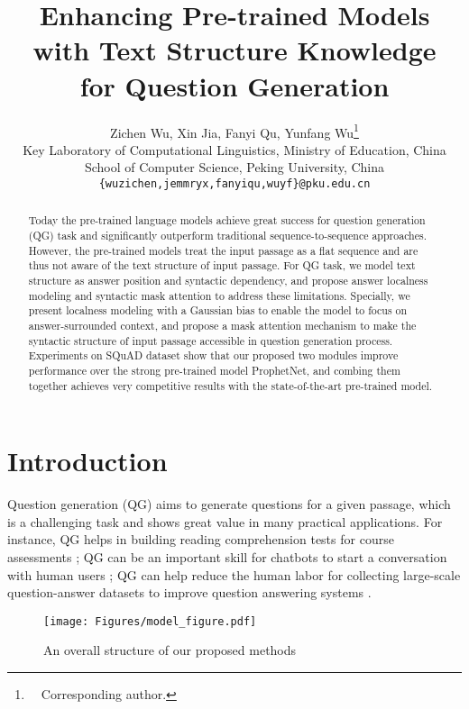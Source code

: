 \documentclass[11pt]{article}
\title{Enhancing Pre-trained Models with Text Structure Knowledge \\ for Question Generation}
\author{Zichen Wu, Xin Jia, Fanyi Qu, Yunfang Wu\thanks{\ \  Corresponding author.} \\
Key Laboratory of Computational Linguistics, Ministry of Education, China \\
School of Computer Science, Peking University, China\\
\texttt{\{wuzichen,jemmryx,fanyiqu,wuyf\}@pku.edu.cn}}
\begin{document}
\maketitle
\begin{abstract}
Today the pre-trained language models achieve great success for question generation (QG) task and significantly outperform traditional sequence-to-sequence approaches. However, the pre-trained models treat the input passage as a flat sequence and are thus not aware of the text structure of input passage. For QG task, we model text structure as answer position and syntactic dependency, and propose answer localness modeling and syntactic mask attention to address these limitations. Specially, we present localness modeling with a Gaussian bias to enable the model to focus on answer-surrounded context, and propose a mask attention mechanism to   
make the syntactic structure of input passage accessible in question generation process.
Experiments on SQuAD dataset show that our proposed two modules improve performance over the strong pre-trained model ProphetNet, and combing them together achieves very competitive results with the state-of-the-art pre-trained model.
\end{abstract}

\section{Introduction}
Question generation (QG) aims to generate questions for a given passage, which is a challenging task and shows great value in many practical applications. For instance, QG helps in building reading comprehension tests for course assessments \citep{kurdi2020systematic};
QG can be an important skill for chatbots to start a conversation with human users \citep{mostafazadeh-etal-2016-generating}; QG can help reduce the human labor for collecting large-scale question-answer datasets to improve question answering systems \citep{duan-etal-2017-question}.  

\begin{figure}[ht]
    \centering
    \texttt{[image: Figures/model\_figure.pdf]}
    \caption{An overall structure of our proposed methods }
    \label{model-fig}
\end{figure}
\end{document}
